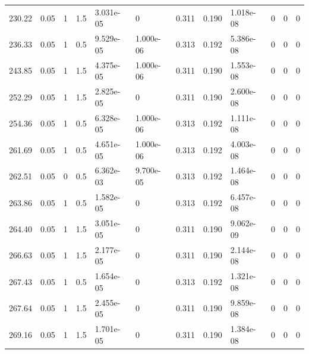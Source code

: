 \documentclass[preview]{standalone}
\begin{document}
{{\begin{tabular}{L{1.2cm}C{1.2cm} C{0.3cm}C{0.5cm} C{1.4cm}C{1.4cm} C{1.4cm}C{1.4cm} C{1.6cm}C{1.6cm} C{1.6cm}C{1.6cm}}
  230.22  &  0.05  & 1     & 1.5 &  3.031e-05  & 0  &  0.311&   0.190& 1.018e-08 & 0   &  0 & 0  \\ 
  236.33  &  0.05  & 1     & 0.5 &  9.529e-05  & 1.000e-06  &  0.313&   0.192& 5.386e-08 & 0   &  0 & 0  \\ 
  243.85  &  0.05  & 1     & 1.5 &  4.375e-05  & 1.000e-06  &  0.311&   0.190& 1.553e-08 & 0   &  0 & 0  \\ 
  252.29  &  0.05  & 1     & 1.5 &  2.825e-05  & 0  &  0.311&   0.190& 2.600e-08 & 0   &  0 & 0  \\ 
  254.36  &  0.05  & 1     & 0.5 &  6.328e-05  & 1.000e-06  &  0.313&   0.192& 1.111e-08 & 0   &  0 & 0  \\ 
  261.69  &  0.05  & 1     & 0.5 &  4.651e-05  & 1.000e-06  &  0.313&   0.192& 4.003e-08 & 0   &  0 & 0  \\ 
  262.51  &  0.05  & 0     & 0.5 &  6.362e-03  & 9.700e-05  &  0.313&   0.192& 1.464e-08 & 0   &  0 & 0  \\ 
  263.86  &  0.05  & 1     & 0.5 &  1.582e-05  & 0  &  0.313&   0.192& 6.457e-08 & 0   &  0 & 0  \\ 
  264.40  &  0.05  & 1     & 1.5 &  3.051e-05  & 0  &  0.311&   0.190& 9.062e-09 & 0   &  0 & 0  \\ 
  266.63  &  0.05  & 1     & 1.5 &  2.177e-05  & 0  &  0.311&   0.190& 2.144e-08 & 0   &  0 & 0  \\ 
  267.43  &  0.05  & 1     & 0.5 &  1.654e-05  & 0  &  0.313&   0.192& 1.321e-08 & 0   &  0 & 0  \\ 
  267.64  &  0.05  & 1     & 1.5 &  2.455e-05  & 0  &  0.311&   0.190& 9.859e-08 & 0   &  0 & 0  \\ 
  269.16  &  0.05  & 1     & 1.5 &  1.701e-05  & 0  &  0.311&   0.190& 1.384e-08 & 0   &  0 & 0  \\ 
\hline 
\end{tabular} 

}}
\end{document}
